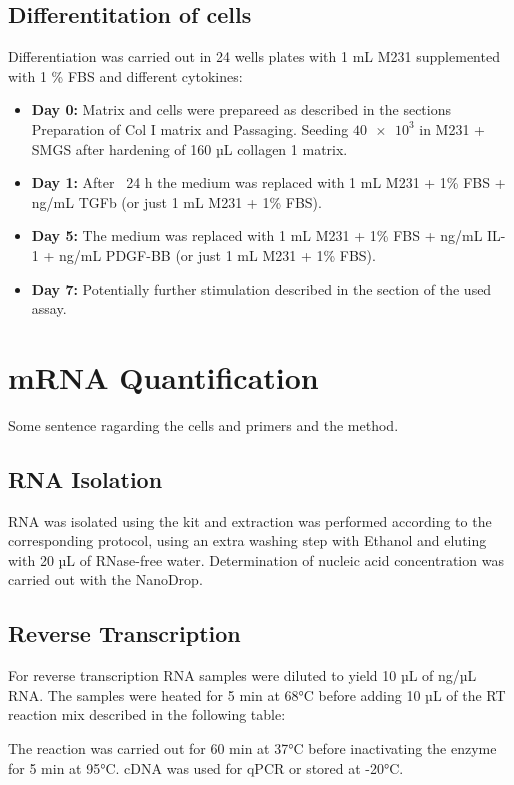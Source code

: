     \subsection{Differentitation of cells}
    Differentiation was carried out in 24 wells plates with 1 mL M231 supplemented with 1 \% FBS and different cytokines:
    \begin{itemize}
        \item \textbf{Day 0:} Matrix and cells were prepareed as described in the sections Preparation of Col I matrix and Passaging. Seeding $\num{40e3}$ in M231 + SMGS after hardening of 160 µL collagen 1 matrix.
        \item \textbf{Day 1:} After ~24 h the medium was replaced with 1 mL M231 + 1\% FBS + ng/mL TGFb (or just 1 mL M231 + 1\% FBS).
        \item \textbf{Day 5:} The medium was replaced with 1 mL M231 + 1\% FBS + ng/mL IL-1 + ng/mL PDGF-BB (or just 1 mL M231 + 1\% FBS).
        \item \textbf{Day 7:} Potentially further stimulation described in the section of the used assay.
    \end{itemize}

\section{mRNA Quantification}
\label{sec:qpcr}
Some sentence ragarding the cells and primers and the method.

    \subsection{RNA Isolation}
    RNA was isolated using the kit and extraction was performed according to the corresponding protocol, using an extra washing step with Ethanol and eluting with 20 µL of RNase-free water. Determination of nucleic acid concentration was carried out with the NanoDrop.

    \subsection{Reverse Transcription}
    For reverse transcription RNA samples were diluted to yield 10 µL of ng/µL RNA. The samples were heated for 5 min at 68°C before adding 10 µL of the RT reaction mix described in the following table:

    The reaction was carried out for 60 min at 37°C before inactivating the enzyme for 5 min at 95°C. cDNA was used for qPCR or stored at -20°C.

